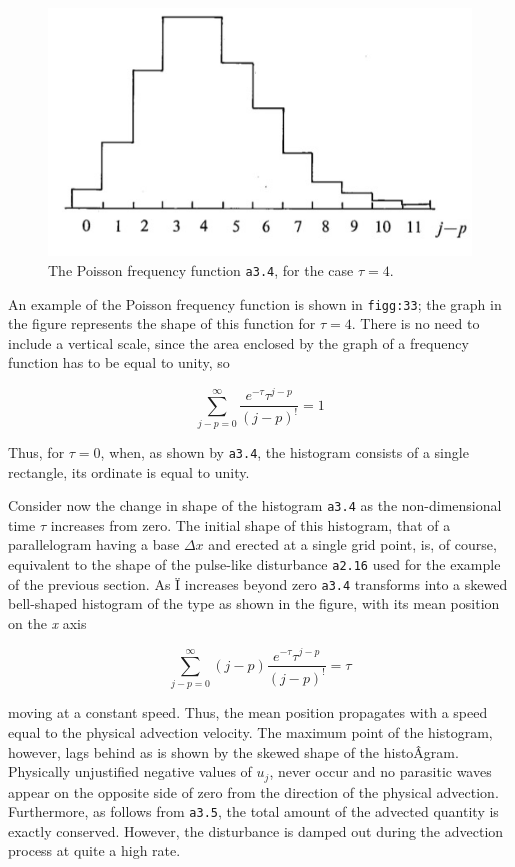 \begin{figure}
 \centering
 \includegraphics[width=0.8\linewidth,height=\textheight,keepaspectratio]{figs/NM/pic33.jpg}
 \caption{The Poisson frequency function \texttt{a3.4}, for the case
  \(\tau = 4\).}
\end{figure}

An example of the Poisson frequency function is shown in
\texttt{figg:33}; the graph in the figure represents the shape of this
function for \(\tau = 4\). There is no need to include a vertical scale,
since the area enclosed by the graph of a frequency function has to be
equal to unity, so

 {\[\sum_{j - p = 0}^{\infty}\frac{e^{- \tau}\tau^{j - p}}{\left( j - p \right)^{!}} = 1\]}

Thus, for \(\tau = 0\), when, as shown by \texttt{a3.4}, the histogram
consists of a single rectangle, its ordinate is equal to unity.

Consider now the change in shape of the histogram \texttt{a3.4} as the
non-dimensional time \(\tau\) increases from zero. The initial shape of
this histogram, that of a parallelogram having a base \(\Delta x\) and
erected at a single grid point, is, of course, equivalent to the shape
of the pulse-like disturbance \texttt{a2.16} used for the example of the
previous section. As Ï increases beyond zero \texttt{a3.4} transforms
into a skewed bell-shaped histogram of the type as shown in the figure,
with its mean position on the \emph{x} axis

\[\sum_{j - p = 0}^{\infty}\left( j - p \right)\frac{e^{- \tau}\tau^{j - p}}{\left( j - p \right)^{!}} = \tau\]

moving at a constant speed. Thus, the mean position propagates with a
speed equal to the physical advection velocity. The maximum point of the
histogram, however, lags behind as is shown by the skewed shape of the
histoÂ­gram. Physically unjustified negative values of \(u_{j}\), never
occur and no parasitic waves appear on the opposite side of zero from
the direction of the physical advection. Furthermore, as follows from
\texttt{a3.5}, the total amount of the advected quantity is exactly
conserved. However, the disturbance is damped out during the advection
process at quite a high rate.

